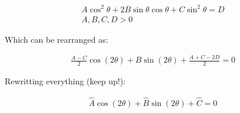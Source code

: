 \documentclass{article}
\begin{document}
\begin{eqnarray}
A\cos^2{\theta} + 2B\sin{\theta}\cos{\theta} + C\sin^2{\theta} = D\\
A,B,C,D > 0
\end{eqnarray}

Which can be rearranged as:

\begin{eqnarray*}
\frac{A-C}{2}\cos{(2\theta)} + B\sin{(2\theta)} + \frac{A+C-2D}{2} = 0
\end{eqnarray*}

Rewritting everything (keep up!):

\begin{eqnarray*}
\hat{A} \cos{(2\theta)} + \hat{B}\sin{(2\theta)} + \hat{C} = 0
\end{eqnarray*}
\end{document}
